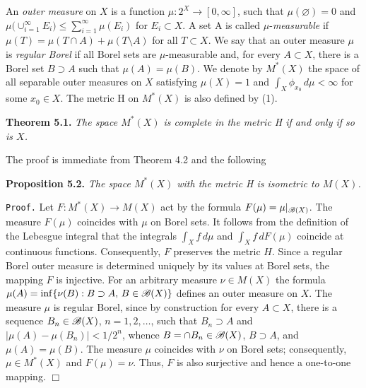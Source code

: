 \documentclass[11pt,a4paper]{article}
\begin{document}
An \emph{outer measure} on $X$ is a function
$\mu:2^X\to[0,\infty]$, such that $\mu(\varnothing)=0$ and
$\mu \bigl( \cup_{i=1}^{\infty}E_i \bigr) \le \sum_{i=1}^{\infty}\mu(E_i)$ for $E_i\subset X$.
A set A is called $\mu$-{\it measurable} if $\mu(T)=\mu(T\cap A)+\mu(T\setminus A)$ for all $T\subset X$.
We say that an outer measure $\mu$ is {\it regular Borel} if all
Borel sets are $\mu$-measurable and, for every $A\subset X$, there is
a Borel set $B\supset A$ such that $\mu(A)=\mu(B)$.
We denote by $M^*(X)$ the space of all separable outer measures on $X$
satisfying $\mu(X)=1$ and $\int_X\phi_{x_0}\, d\mu<\infty$ for some $x_0\in X$.
The metric H on $M^*(X)$ is also defined by (1).

\vspace{1em} {\bf Theorem 5.1.} \sl
The space $M^*(X)$ is complete in the metric H if and only if so is $X$. \rm
\vspace{1em} %

The proof is immediate from Theorem 4.2 and the following

\vspace{1em} {\bf Proposition 5.2.} \sl
 The space $M^*(X)$ with the metric H is isometric to $M(X)$. \rm

\vspace{1em} {\tt Proof.}
Let $F:M^*(X)\to M(X)$ act by the formula $F(\mu)=\mu|_{{\cal B}(X)}$.
The measure $F(\mu)$ coincides
with $\mu$ on Borel sets.
It follows from the definition of the Lebesgue integral that the integrals
$\int_X f\,d\mu$ and $\int_X f\,dF(\mu)$
coincide at continuous functions.
Consequently, $F$ preserves the metric $H$.
Since a regular Borel outer measure is determined uniquely
by its values at Borel sets, the mapping $F$ is injective.
For an arbitrary measure $\nu\in M(X)$ the formula
$\mu(A)=\inf\{\nu(B): B\supset A,\, B\in{\cal B}(X)\}$
defines an outer measure on $X$.
The measure $\mu$ is regular Borel,
since by construction for every $A\subset X$,
there is a sequence $B_n\in{\cal B}(X)$, $n=1,2,\ldots$,
such that $B_n\supset A$ and $|\mu(A)-\mu(B_n)|< 1/2^n$,
whence $B=\cap B_n\in{\cal B}(X)$, $B\supset A$, and $\mu(A)=\mu(B)$.
The measure $\mu$ coincides with $\nu$ on Borel sets; consequently,
$\mu\in M^*(X)$ and $F(\mu)=\nu$.
Thus, $F$ is also surjective and hence a one-to-one mapping.
\hbox{$\Box$}
\end{document}
